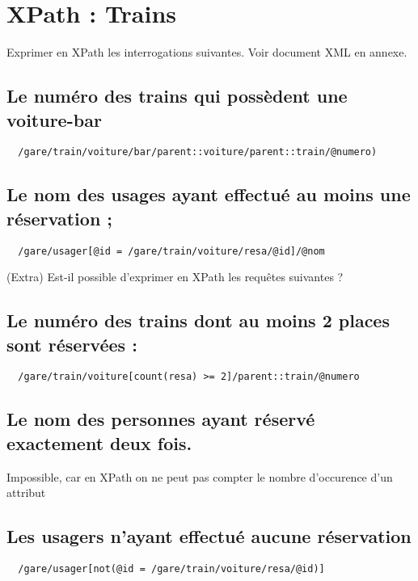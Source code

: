 \chapter{XPath : Trains}
Exprimer en XPath les interrogations suivantes.
Voir document XML en annexe.

\section{Le numéro des trains qui possèdent une voiture-bar}
\begin{verbatim}
  /gare/train/voiture/bar/parent::voiture/parent::train/@numero)
\end{verbatim}

\section{Le nom des usages ayant effectué au moins une réservation ;}
\begin{verbatim}
  /gare/usager[@id = /gare/train/voiture/resa/@id]/@nom
\end{verbatim}

(Extra) Est-il possible d’exprimer en XPath les requêtes suivantes ?

\section{Le numéro des trains dont au moins 2 places sont réservées :}
\begin{verbatim}
  /gare/train/voiture[count(resa) >= 2]/parent::train/@numero
\end{verbatim}


\section{Le nom des personnes ayant réservé exactement deux fois.}
Impossible, car en XPath on ne peut pas compter le nombre d'occurence d'un attribut

\section{Les usagers n’ayant effectué aucune réservation}
\begin{verbatim}
  /gare/usager[not(@id = /gare/train/voiture/resa/@id)]
\end{verbatim}
